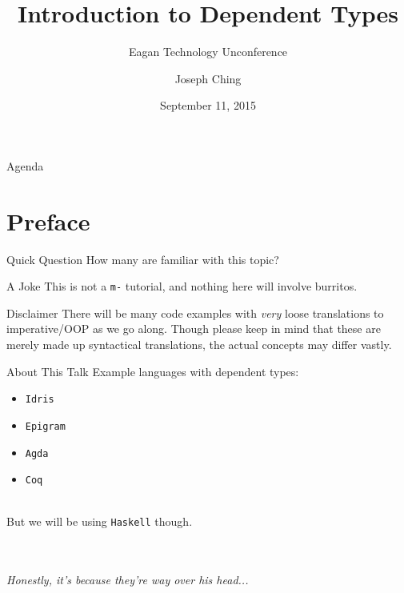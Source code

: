 \documentclass[xcolor={usenames,dvipsnames}]{beamer}
\title{Introduction to Dependent Types}
\subtitle{Eagan Technology Unconference}
\author{Joseph Ching}
\date{September 11, 2015}
\begin{document}
\begin{frame}[plain]
  \titlepage
\end{frame}


\begin{frame}{Agenda}
  \tableofcontents[
    sectionstyle=show,
    subsectionstyle=hide
  ]
\end{frame}


\section{Preface}

\begin{frame}{Quick Question}
  How many are familiar with this topic?
\end{frame}

\begin{frame}{A Joke}
  This is not a \texttt{m-} tutorial, and nothing here will involve burritos.
\end{frame}

\begin{frame}{Disclaimer}
  There will be many code examples with \textit{very} loose translations to imperative/OOP as we go along. Though please keep in mind that these are merely made up syntactical translations, the actual concepts may differ vastly.
\end{frame}

\begin{frame}{About This Talk}
  Example languages with dependent types:
  \begin{itemize}
    \item \texttt{Idris}
    \item \texttt{Epigram}
    \item \texttt{Agda}
    \item \texttt{Coq}
  \end{itemize}

    \ \\
    \pause
    But we will be using \texttt{Haskell} though.

    \ \\
    \ \\
    \textit{\tiny{Honestly, it's because they're way over his head...}}\\
\end{frame}
\end{document}
